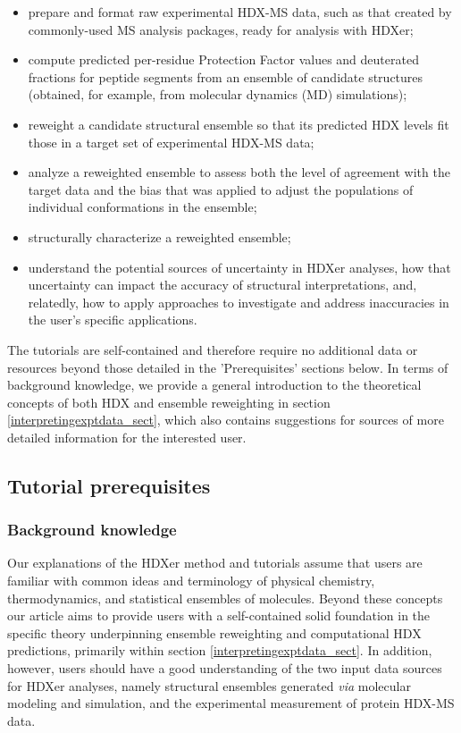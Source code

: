 \documentclass[9pt,tutorial]{livecoms}
\begin{document}
\begin{itemize}
\item prepare and format raw experimental HDX-MS data, such as that created by commonly-used MS analysis packages, ready for analysis with HDXer;
\item compute predicted per-residue Protection Factor values and deuterated fractions for peptide segments from an ensemble of candidate structures (obtained, for example, from molecular dynamics (MD) simulations);
\item reweight a candidate structural ensemble so that its predicted HDX levels fit those in a target set of experimental HDX-MS data;
\item analyze a reweighted ensemble to assess both the level of agreement with the target data and the bias that was applied to adjust the populations of individual conformations in the ensemble;
\item structurally characterize a reweighted ensemble;
\item understand the potential sources of uncertainty in HDXer analyses, how that uncertainty can impact the accuracy of structural interpretations, and, relatedly, how to apply approaches to investigate and address inaccuracies in the user's specific applications.
\end{itemize}

The tutorials are self-contained and therefore require no additional data or resources beyond those detailed in the 'Prerequisites' sections below. 
In terms of background knowledge, we provide a general introduction to the theoretical concepts of both HDX and ensemble reweighting in section \ref{interpretingexptdata_sect}, which also contains suggestions for sources of more detailed information for the interested user.

\subsection{Tutorial prerequisites}
\subsubsection{Background knowledge}
Our explanations of the HDXer method and tutorials assume that users are familiar with common ideas and terminology of physical chemistry, thermodynamics, and statistical ensembles of molecules.
Beyond these concepts our article aims to provide users with a self-contained solid foundation in the specific theory underpinning ensemble reweighting and computational HDX predictions, primarily within section \ref{interpretingexptdata_sect}.
In addition, however, users should have a good understanding of the two input data sources for HDXer analyses, namely structural ensembles generated \textit{via} molecular modeling and simulation, and the experimental measurement of protein HDX-MS data.
\end{document}
